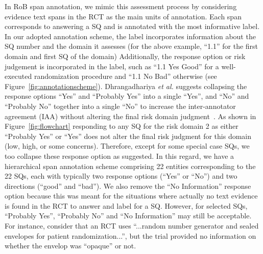 \documentclass[sn-mathphys,Numbered]{sn-jnl}%
\theoremstyle{thmstyleone}%
\theoremstyle{thmstyletwo}%
\theoremstyle{thmstylethree}%
\begin{document}
In RoB span annotation, we mimic this assessment process by considering evidence text spans in the RCT as the main units of annotation.
Each span corresponds to answering a SQ and is annotated with the most informative label. 
In our adopted annotation scheme, the label incorporates information about the SQ number and the domain it assesses (for the above example, ``1.1'' for the first domain and first SQ of the domain)
Additionally, the response option or risk judgement is incorporated in the label, such as ``1.1 Yes Good'' for a well-executed randomization procedure and ``1.1 No Bad'' otherwise (see Figure~\ref{fig:annotationscheme}).
Dhrangadhariya \textit{et al.} suggests collapsing the response options ``Yes'' and ``Probably Yes'' into a single ``Yes'', and ``No'' and ``Probably No'' together into a single ``No'' to increase the inter-annotator agreement (IAA) without altering the final risk domain judgment~\cite{dhrangadhariya2023first}.
As shown in Figure~\ref{fig:flowchart} responding to any SQ for the risk domain 2 as either ``Probably Yes'' or ``Yes'' does not alter the final risk judgment for this domain (low, high, or some concerns).
Therefore, except for some special case SQs, we too collapse these response option as suggested.
In this regard, we have a hierarchical span annotation scheme comprising 22 entities corresponding to the 22 SQs, each with typically two response options (``Yes'' or ``No'') and two directions (``good'' and ``bad'').
We also remove the ``No Information'' response option because this was meant for the situations where actually no text evidence is found in the RCT to answer and label for a SQ.
However, for selected SQs, ``Probably Yes'', ``Probably No'' and ``No Information'' may still be acceptable.
For instance, consider that an RCT uses ``...random number generator and sealed envelopes for patient randomization...'', but the trial provided no information on whether the envelop was ``opaque'' or not.
\end{document}

